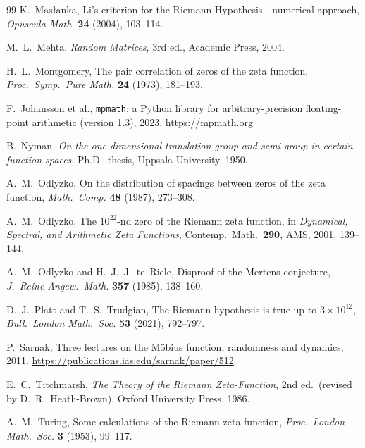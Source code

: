 \documentclass[11pt,a4paper]{article}
\theoremstyle{definition}
\begin{document}
\begin{thebibliography}{99}
K.~Mas\l{}anka, Li's criterion for the Riemann Hypothesis---numerical approach, \emph{Opuscula Math.} \textbf{24} (2004), 103--114.

M.~L.~Mehta, \emph{Random Matrices}, 3rd ed., Academic Press, 2004.

H.~L.~Montgomery, The pair correlation of zeros of the zeta function, \emph{Proc.\ Symp.\ Pure Math.} \textbf{24} (1973), 181--193.

F.~Johansson et al., \texttt{mpmath}: a Python library for arbitrary-precision floating-point arithmetic (version 1.3), 2023. \url{https://mpmath.org}

B.~Nyman, \emph{On the one-dimensional translation group and semi-group in certain function spaces}, Ph.D.\ thesis, Uppsala University, 1950.

A.~M.~Odlyzko, On the distribution of spacings between zeros of the zeta function, \emph{Math.\ Comp.} \textbf{48} (1987), 273--308.

A.~M.~Odlyzko, The $10^{22}$-nd zero of the Riemann zeta function, in \emph{Dynamical, Spectral, and Arithmetic Zeta Functions}, Contemp.\ Math.\ \textbf{290}, AMS, 2001, 139--144.

A.~M.~Odlyzko and H.~J.~J.~te~Riele, Disproof of the Mertens conjecture, \emph{J.\ Reine Angew.\ Math.} \textbf{357} (1985), 138--160.

D.~J.~Platt and T.~S.~Trudgian, The Riemann hypothesis is true up to $3 \times 10^{12}$, \emph{Bull.\ London Math.\ Soc.} \textbf{53} (2021), 792--797.

P.~Sarnak, Three lectures on the M\"obius function, randomness and dynamics, 2011. \url{https://publications.ias.edu/sarnak/paper/512}

E.~C.~Titchmarsh, \emph{The Theory of the Riemann Zeta-Function}, 2nd ed.\ (revised by D.~R.~Heath-Brown), Oxford University Press, 1986.

A.~M.~Turing, Some calculations of the Riemann zeta-function, \emph{Proc.\ London Math.\ Soc.} \textbf{3} (1953), 99--117.

\end{thebibliography}
\end{document}
